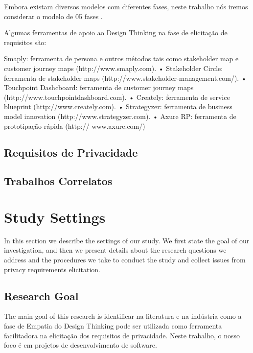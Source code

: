 \documentclass[conference]{IEEEtran}
\begin{document}
Embora existam diversos modelos com diferentes fases, neste trabalho nós iremos considerar o modelo de 05 fases \cite{DBLP:conf/hci/XimenesAA15, DBLP:conf/icse/CarrollR16}.  

Algumas ferramentas de apoio ao Design Thinking na fase de elicitação de requisitos são:

Smaply: ferramenta de persona e outros métodos tais como
stakeholder map e customer journey maps
(http://www.smaply.com).
• Stakeholder Circle: ferramenta de stakeholder maps
(http://www.stakeholder-management.com/).
• Touchpoint Dashcboard: ferramenta de customer journey maps
(http://www.touchpointdashboard.com).
• Creately: ferramenta de service blueprint
(http://www.creately.com).
• Strategyzer: ferramenta de business model innovation
(http://www.strategyzer.com).
• Axure RP: ferramenta de prototipação rápida (http://
www.axure.com/)


\subsection{Requisitos de Privacidade}
\cite{DBLP:conf/wer/2019}
\subsection{Trabalhos Correlatos}


\section{Study Settings}
\label{method}

In this section we describe the settings of our study. We first state the goal of our investigation, and then we present details about the research questions we address and the procedures we take to conduct the study and collect issues from privacy requirements elicitation.

\subsection{Research Goal}

The main goal of this research is identificar na literatura e na indústria como a fase de Empatia do Design Thinking pode ser utilizada como ferramenta facilitadora na elicitação dos requisitos de privacidade. Neste trabalho, o nosso foco é em projetos de desenvolvimento de software. 
\end{document}
